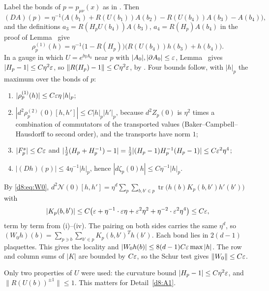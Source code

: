 \begin{detail}
\begin{step}
Label the bonds of $p=p_{\mu\nu}(x)$ as in . Then
\[
(DA)(p)=\eta^{-1}\big(A(b_1)+R(U(b_1))A(b_2)-R(U(b_4))A(b_3)-A(b_4)\big),
\]
and the definitions $a_3=R(H_pU(b_4))A(b_3)$, $a_4=R(H_p)A(b_4)$ in the proof of Lemma~ give
\[
\rho^{(1)}_p(h)=\eta^{-1}\big(1-R(H_p)\big)\big(R(U(b_4))h(b_3)+h(b_4)\big).
\]
In a gauge in which $U=e^{\ii\eta A_0}$ near $p$ with $|A_0|,|\partial A_0|\le\varepsilon$, Lemma~ gives $|H_p-1|\le C\eta^2\varepsilon$, so $\|R(H_p)-1\|\le C\eta^2\varepsilon$, by . Four bounds follow, with $|h|_p$ the maximum over the bonds of $p$:
\begin{enumerate}[label=(\roman*)]
\item $|\rho^{(1)}_p(h)|\le C\varepsilon\eta\,|h|_p$;
\item $|d^2\rho^{(2)}_p(0)[h,h']|\le C|h|_p|h'|_p$, because $d^2Z_p(0)$ is $\eta^2$ times a combination of commutators of the transported values (Baker--Campbell--Hausdorff to second order), and the transports have norm $1$;
\item $|F^s_p|\le C\varepsilon$ and $|\frac12(H_p+H_p^{-1})-1|=\frac12|(H_p-1)H_p^{-1}(H_p-1)|\le C\varepsilon^2\eta^4$;
\item $|(Dh)(p)|\le4\eta^{-1}|h|_p$, hence $|d\zeta_p(0)h|\le C\eta^{-1}|h|_p$.
\end{enumerate}
\end{step}

\begin{step}
By \eqref{d8:eq:W0}, $d^2\mathcal N(0)[h,h']=\eta^d\sum_p\sum_{b,b'\in p}\operatorname{tr}\big(h(b)K_p(b,b')h'(b')\big)$ with
\[
|K_p(b,b')|\le C\big(\varepsilon+\eta^{-1}\cdot\varepsilon\eta+\varepsilon^2\eta^2+\eta^{-2}\cdot\varepsilon^2\eta^4\big)\le C\varepsilon ,
\]
term by term from (i)--(iv). The pairing on both sides carries the same $\eta^d$, so $(W_0h)(b)=\sum_{p\ni b}\sum_{b'\in p}K_p(b,b')^Th(b')$. Each bond lies in $2(d-1)$ plaquettes. This gives the locality and $|W_0h(b)|\le8(d-1)C\varepsilon\max|h|$. The row and column sums of $|K|$ are bounded by $C\varepsilon$, so the Schur test gives $\|W_0\|\le C\varepsilon$.
\end{step}
Only two properties of $U$ were used: the curvature bound $|H_p-1|\le C\eta^2\varepsilon$, and $\|R(U(b))^{\pm1}\|\le1$. This matters for Detail~\ref{d8:A1}.

\end{detail}


